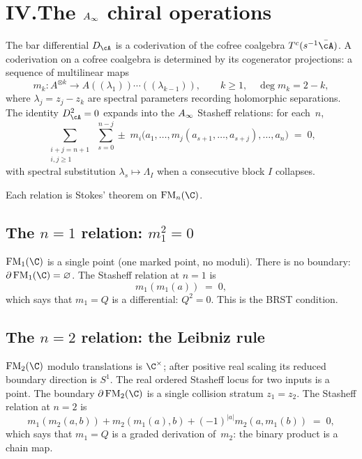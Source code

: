 \section*{IV.\quad The $A_\infty$ chiral operations}

The bar differential $D_\cA$ is a coderivation of the cofree
coalgebra $T^c(s^{-1}\bar\cA)$. A coderivation on a cofree
coalgebra is determined by its cogenerator projections: a sequence
of multilinear maps
\[
m_k \colon A^{\otimes k} \longrightarrow
A((\lambda_1))\cdots((\lambda_{k-1})),
\qquad k \ge 1, \quad \deg m_k = 2 - k,
\]
where $\lambda_j = z_j - z_k$ are spectral parameters recording
holomorphic separations. The identity $D_\cA^2 = 0$ expands into
the $A_\infty$ Stasheff relations: for each~$n$,
\begin{equation}\label{eq:preface2-stasheff}
\sum_{\substack{i+j = n+1 \\ i,j \ge 1}}\;\sum_{s=0}^{n-j}
\pm\; m_i\bigl(a_1, \ldots, m_j(a_{s+1}, \ldots, a_{s+j}),
\ldots, a_n\bigr) \;=\; 0,
\end{equation}
with spectral substitution $\lambda_s \mapsto \Lambda_I$ when a
consecutive block $I$ collapses.

Each relation is Stokes' theorem on $\FM_n(\C)$.

\subsection*{The $n = 1$ relation: $m_1^2 = 0$}

$\FM_1(\C)$ is a single point (one marked point, no moduli).
There is no boundary: $\partial\FM_1(\C) = \varnothing$.
The Stasheff relation at $n = 1$ is
\[
m_1(m_1(a)) \;=\; 0,
\]
which says that $m_1 = Q$ is a differential: $Q^2 = 0$. This is
the BRST condition.

\subsection*{The $n = 2$ relation: the Leibniz rule}

$\FM_2(\C)$ modulo translations is $\C^\times$; after positive real
scaling its reduced boundary direction is $S^1$.  The real ordered
Stasheff locus for two inputs is a point. The boundary
$\partial\FM_2(\C)$ is a single collision stratum $z_1 = z_2$.
The Stasheff relation at $n = 2$ is
\[
m_1(m_2(a,b)) + m_2(m_1(a),b) +
(-1)^{|a|} m_2(a,m_1(b)) \;=\; 0,
\]
which says that $m_1 = Q$ is a graded derivation of~$m_2$:
the binary product is a chain map.

